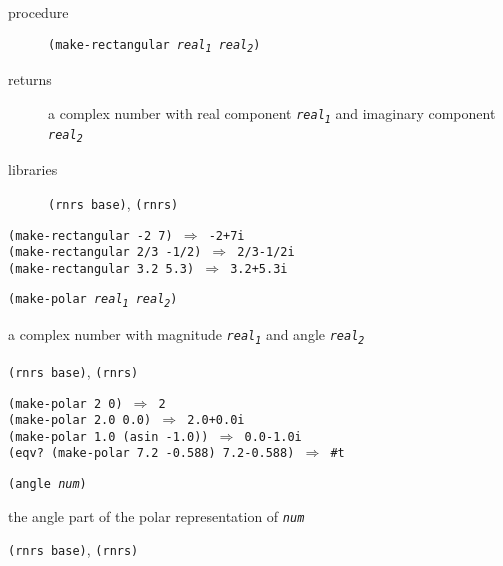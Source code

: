 \begin{description}

\label{objects_s122}\item[procedure] \texttt{(make-rectangular \textit{real\textsubscript{1}} \textit{real\textsubscript{2}})}



\item[returns] a complex number with real component \texttt{\textit{real\textsubscript{1}}} and imaginary
  component \texttt{\textit{real\textsubscript{2}}}


\item[libraries] \texttt{(rnrs base)}, \texttt{(rnrs)}
\end{description}


\begin{alltt}
(make-rectangular -2 7) \(\Rightarrow\) -2+7i
(make-rectangular 2/3 -1/2) \(\Rightarrow\) 2/3-1/2i
(make-rectangular 3.2 5.3) \(\Rightarrow\) 3.2+5.3i
\end{alltt}

\begin{description}

\label{objects_s123}\item[procedure] \texttt{(make-polar \textit{real\textsubscript{1}} \textit{real\textsubscript{2}})}



\item[returns] a complex number with magnitude \texttt{\textit{real\textsubscript{1}}} and angle
    \texttt{\textit{real\textsubscript{2}}}


\item[libraries] \texttt{(rnrs base)}, \texttt{(rnrs)}
\end{description}


\begin{alltt}
(make-polar 2 0) \(\Rightarrow\) 2
(make-polar 2.0 0.0) \(\Rightarrow\) 2.0+0.0i
(make-polar 1.0 (asin -1.0)) \(\Rightarrow\) 0.0-1.0i
(eqv? (make-polar 7.2 -0.588) 7.2\@{}-0.588) \(\Rightarrow\) \#{}t
\end{alltt}

\begin{description}

\label{objects_s124}\item[procedure] \texttt{(angle \textit{num})}



\item[returns] the angle part of the polar representation of \texttt{\textit{num}}


\item[libraries] \texttt{(rnrs base)}, \texttt{(rnrs)}
\end{description}


